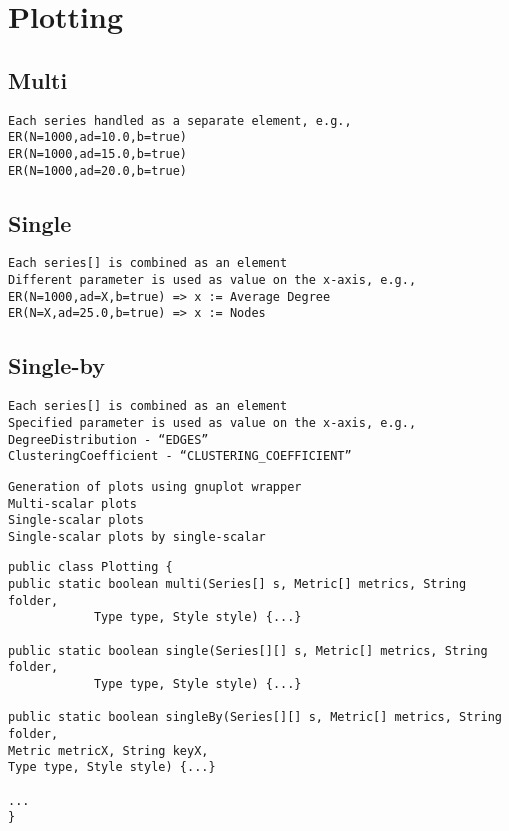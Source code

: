 
\section{Plotting}
\label{sec:plotting}


\subsection{Multi}

\begin{verbatim}
Each series handled as a separate element, e.g.,
ER(N=1000,ad=10.0,b=true)
ER(N=1000,ad=15.0,b=true)
ER(N=1000,ad=20.0,b=true)
\end{verbatim}



\subsection{Single}

\begin{verbatim}
Each series[] is combined as an element
Different parameter is used as value on the x-axis, e.g.,
ER(N=1000,ad=X,b=true) => x := Average Degree
ER(N=X,ad=25.0,b=true) => x := Nodes
\end{verbatim}




\subsection{Single-by}

\begin{verbatim}
Each series[] is combined as an element
Specified parameter is used as value on the x-axis, e.g.,
DegreeDistribution - “EDGES”
ClusteringCoefficient - “CLUSTERING_COEFFICIENT”
\end{verbatim}








\begin{verbatim}
Generation of plots using gnuplot wrapper
Multi-scalar plots
Single-scalar plots
Single-scalar plots by single-scalar
\end{verbatim}



\begin{lstlisting}[label={},caption={}]
public class Plotting {
public static boolean multi(Series[] s, Metric[] metrics, String folder,
			Type type, Style style) {...}

public static boolean single(Series[][] s, Metric[] metrics, String folder,
			Type type, Style style) {...}

public static boolean singleBy(Series[][] s, Metric[] metrics, String folder,
Metric metricX, String keyX,
Type type, Style style) {...}

...
}
\end{lstlisting}



